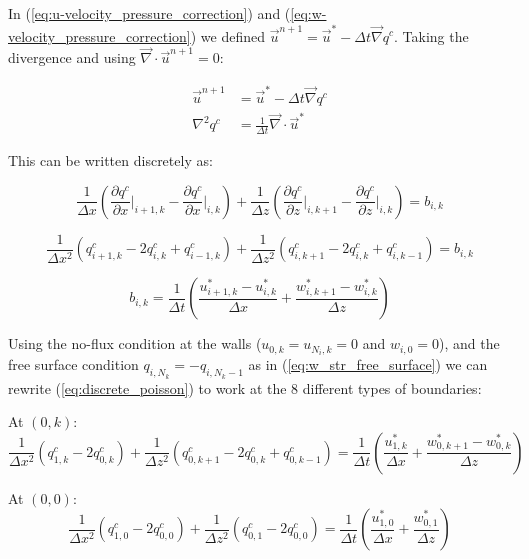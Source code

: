 \documentclass[12pt]{article}
\begin{document}
\section{}

In (\ref{eq:u-velocity_pressure_correction}) and (\ref{eq:w-velocity_pressure_correction}) we defined $\vec{u}^{n+1} = \vec{u}^* - \Delta t \vec{\nabla} q^c$. Taking the divergence and using $\vec{\nabla} \cdot \vec{u}^{n+1} = 0$:

\begin{align*}
\vec{u}^{n+1} &= \vec{u}^* - \Delta t \vec{\nabla} q^c
\\
\nabla^2 q^c &= \frac{1}{\Delta t} \vec{\nabla} \cdot \vec{u}^*
\end{align*}

This can be written discretely as:

\begin{equation*}
\frac{1}{\Delta x} \left( \frac{\partial q^c}{\partial x} \bigg|_{i+1,k} - \frac{\partial q^c}{\partial x} \bigg|_{i,k} \right) 
+ \frac{1}{\Delta z} \left( \frac{\partial q^c}{\partial z} \bigg|_{i,k+1} - \frac{\partial q^c}{\partial z} \bigg|_{i,k} \right) = b_{i,k}
\end{equation*}

\begin{equation} \label{eq:discrete_poisson}
\frac{1}{\Delta x^2} (q_{i+1,k}^c - 2 q_{i,k}^c + q_{i-1,k}^c) 
+ \frac{1}{\Delta z^2} (q_{i,k+1}^c- 2 q_{i,k}^c + q_{i,k-1}^c) = b_{i,k}
\end{equation}

\begin{equation*}
b_{i,k} = \frac{1}{\Delta t} \left( \frac{u_{i+1,k}^* - u_{i,k}^*}{\Delta x}  + \frac{w_{i,k+1}^* - w_{i,k}^*}{\Delta z}\right)
\end{equation*}

Using the no-flux condition at the walls ($u_{0,k}=u_{N_i,k}=0$ and $w_{i,0} = 0$), and the free surface condition $q_{i,N_k}=-q_{i,N_k-1}$ as in (\ref{eq:w_str_free_surface}) we can rewrite (\ref{eq:discrete_poisson}) to work at the 8 different types of boundaries:

At $(0,k)$:
\begin{equation*}
\frac{1}{\Delta x^2} (q_{1,k}^c - 2 q_{0,k}^c) 
+ \frac{1}{\Delta z^2} (q_{0,k+1}^c- 2 q_{0,k}^c + q_{0,k-1}^c) = \frac{1}{\Delta t} \left( \frac{u_{1,k}^*}{\Delta x}  + \frac{w_{0,k+1}^* - w_{0,k}^*}{\Delta z}\right)
\end{equation*}

At $(0,0)$:
\begin{equation*}
\frac{1}{\Delta x^2} (q_{1,0}^c - 2 q_{0,0}^c) 
+ \frac{1}{\Delta z^2} (q_{0,1}^c- 2 q_{0,0}^c) = \frac{1}{\Delta t} \left( \frac{u_{1,0}^*}{\Delta x}  + \frac{w_{0,1}^*}{\Delta z}\right)
\end{equation*}
\end{document}

